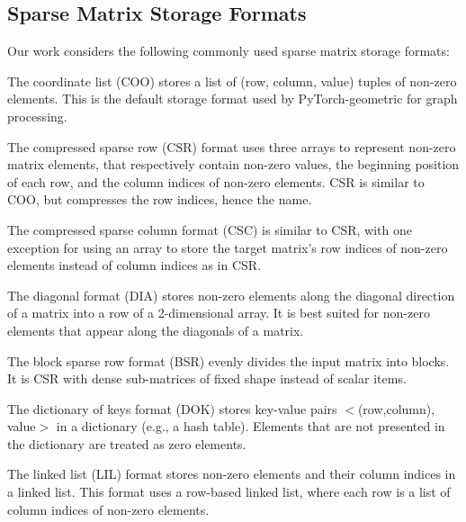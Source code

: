 \vspace{-3mm}
\subsection{Sparse Matrix Storage Formats\label{sec:sf}}
\vspace{-2mm}
Our work considers the following commonly used sparse matrix storage formats:

 The coordinate list (COO) stores a list of (row, column, value) tuples of non-zero elements. This is the default storage format used by PyTorch-geometric \cite{fey2019fast} for graph processing. 

 The compressed sparse row (CSR) format uses three arrays to represent non-zero matrix elements, that respectively contain non-zero values, the beginning position of each row, and the column indices of non-zero elements. CSR is similar to COO, but compresses the row indices, hence the name.

 The compressed sparse column format (CSC) is similar to CSR, with one exception for using an array to store the target matrix's row indices of non-zero elements instead of column indices as in CSR.

 The diagonal format (DIA) stores non-zero elements along the diagonal direction of a matrix into a row of a 2-dimensional array. It is best suited for non-zero elements that appear along the diagonals of a matrix.

The block sparse row format (BSR) evenly divides the input matrix into blocks. It is CSR with dense sub-matrices of fixed shape instead of scalar items.


The dictionary of keys format (DOK) stores key-value pairs $<$(row,column), value$>$ in a dictionary (e.g., a hash table). Elements that are not presented in the dictionary are treated as zero elements.


The linked list (LIL) format stores non-zero elements and their column indices in a linked list. This format uses a row-based linked list, where each row is a list of column indices of non-zero elements.

